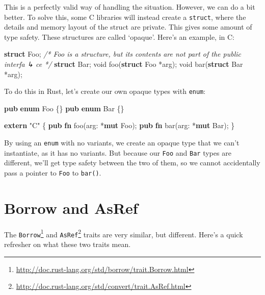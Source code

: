 \documentclass[a4paper,]{book}
\newenvironment{Shaded}{\begin{snugshade}}{\end{snugshade}}
\newcommand{\KeywordTok}[1]{\textcolor[rgb]{0.13,0.29,0.53}{\textbf{{#1}}}}
\newcommand{\DataTypeTok}[1]{\textcolor[rgb]{0.13,0.29,0.53}{{#1}}}
\newcommand{\StringTok}[1]{\textcolor[rgb]{0.31,0.60,0.02}{{#1}}}
\newcommand{\CommentTok}[1]{\textcolor[rgb]{0.56,0.35,0.01}{\textit{{#1}}}}
\newcommand{\NormalTok}[1]{{#1}}
\renewcommand{\href}[2]{#2\footnote{\url{#1}}}
\begin{document}
This is a perfectly valid way of handling the situation. However, we can
do a bit better. To solve this, some C libraries will instead create a
\texttt{struct}, where the details and memory layout of the struct are
private. This gives some amount of type safety. These structures are
called `opaque'. Here's an example, in C:

\begin{Shaded}
\begin{Highlighting}[]
\KeywordTok{struct} \NormalTok{Foo; }\CommentTok{/* Foo is a structure, but its contents are not part of the public interfa}
\CommentTok{↳ ce */}
\KeywordTok{struct} \NormalTok{Bar;}
\DataTypeTok{void} \NormalTok{foo(}\KeywordTok{struct} \NormalTok{Foo *arg);}
\DataTypeTok{void} \NormalTok{bar(}\KeywordTok{struct} \NormalTok{Bar *arg);}
\end{Highlighting}
\end{Shaded}

To do this in Rust, let's create our own opaque types with
\texttt{enum}:

\begin{Shaded}
\begin{Highlighting}[]
\KeywordTok{pub} \KeywordTok{enum} \NormalTok{Foo \{\}}
\KeywordTok{pub} \KeywordTok{enum} \NormalTok{Bar \{\}}

\KeywordTok{extern} \StringTok{"C"} \NormalTok{\{}
    \KeywordTok{pub} \KeywordTok{fn} \NormalTok{foo(arg: *}\KeywordTok{mut} \NormalTok{Foo);}
    \KeywordTok{pub} \KeywordTok{fn} \NormalTok{bar(arg: *}\KeywordTok{mut} \NormalTok{Bar);}
\NormalTok{\}}
\end{Highlighting}
\end{Shaded}

By using an \texttt{enum} with no variants, we create an opaque type
that we can't instantiate, as it has no variants. But because our
\texttt{Foo} and \texttt{Bar} types are different, we'll get type safety
between the two of them, so we cannot accidentally pass a pointer to
\texttt{Foo} to \texttt{bar()}.

\section{Borrow and AsRef}\label{sec--borrow-and-asref}

The
\href{http://doc.rust-lang.org/std/borrow/trait.Borrow.html}{\texttt{Borrow}}
and
\href{http://doc.rust-lang.org/std/convert/trait.AsRef.html}{\texttt{AsRef}}
traits are very similar, but different. Here's a quick refresher on what
these two traits mean.
\end{document}

